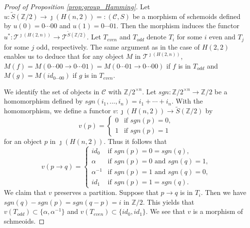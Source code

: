 \documentclass{amsart}
\theoremstyle{definition}
\theoremstyle{remark}
\newcommand{\C}{{\mathcal C}}
\newcommand{\T}{{\mathcal T}}
\begin{document}
\begin{proof}[Proof of Proposition \ref{prop:group_Hamming}]
Let $u :  \widetilde{S}({\mathbb Z}/2)\to \jmath(H(n, 2))=:(\C, S)$ be a morphism of schemoids 
defined by $u(0) = 0\cdots 00$ and $u(1) = 0\cdots 01$. Then the morphism induces the functor $u^* : \T^{\jmath(H(2,n))} \to 
\T^{\widetilde{S}({\mathbb Z}/2)}$. 
Let $T_{even}$ and $T_{odd}$ denote $T_i$ for some $i$ even and $T_j$ for some $j$ odd, respectively. 
The same argument as in the case of $H(2,2)$ enables us to deduce that for any object $M$ in $\T^{\jmath(H(2,n))}$, 
$M(f) = M(0\cdots 00 \to 0\cdots 01) = M(0\cdots 01 \to 0\cdots 00)$ if $f$ is in $T_{odd}$ and $M(g) = M(id_{0\cdots 00})$ if $g$ is in $T_{even}$. 


We identify the set of objects in $\C$ with ${\mathbb Z}/2^{\times n}$. Let $sgn : {\mathbb Z}/2^{\times n} \to {\mathbb Z}/2$ be a 
homomorphism defined by $sgn(i_1, ..., i_n)=i_1+\cdots +i_n$. 
With the homomorphism, 
we define a functor $v : \jmath(H(n, 2)) \to \widetilde{S}({\mathbb Z}/2)$ by 
$$
v(p) = \begin{cases}
0 & \text{if $sgn(p)=0$},  \\
1 &  \text{if $sgn(p)= 1$} 
\end{cases}
$$
for an object $p$ in $\jmath(H(n, 2))$. Thus it follows that 
$$
v(p \to q) = \begin{cases}
id_0 & \text{if $sgn(p)=0=sgn(q)$},  \\
\alpha &  \text{if $sgn(p)=0$ and $sgn(q)=1$}, \\
\alpha^{-1}  & \text{if $sgn(p)=1$ and $sgn(q)=0$}, \\
id_1 & \text{if $sgn(p)=1=sgn(q)$}.
\end{cases}
$$
We claim that $v$ preserves a partition.  Suppose that $p\to q$ is in $T_i$. Then we have $sgn(q) - sgn(p) =sgn(q - p) = i$ 
in ${\mathbb Z}/2$. This yields that $v(T_{odd}) \subset \{\alpha, \alpha^{-1}\}$ and 
$v(T_{even}) \subset \{id_0, id_1\}$. We see that $v$ is a morphism of schmeoids. 


\end{proof}
\end{document}
